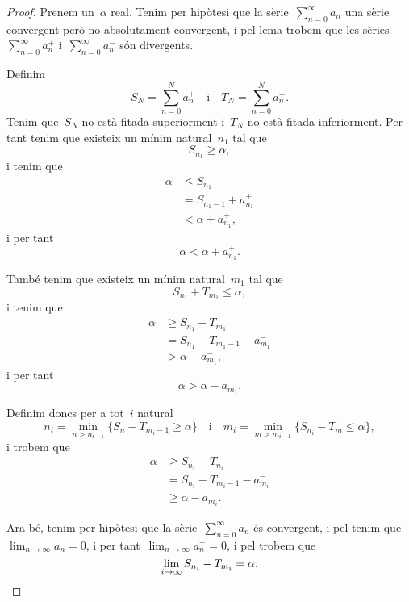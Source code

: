\documentclass[../../main.tex]{subfiles}
\begin{document}
    \begin{proof}
        Prenem un~\(\alpha\) real.
        Tenim per hipòtesi que la sèrie~\(\sum_{n=0}^{\infty}a_{n}\) una sèrie convergent però no absolutament convergent, i pel lema  trobem que les sèries~\(\sum_{n=0}^{\infty}a^{+}_{n}\) i~\(\sum_{n=0}^{\infty}a^{-}_{n}\) són divergents.

        Definim
        \[
            S_{N}=\sum_{n=0}^{N}a^{+}_{n}\quad\text{i}\quad T_{N}=\sum_{n=0}^{N}a^{-}_{n}.
        \]
        Tenim que~\(S_{N}\) no està fitada superiorment i~\(T_{N}\) no està fitada inferiorment.
        Per tant tenim que existeix un mínim natural~\(n_{1}\) tal que
        \[
            S_{n_{1}}\geq\alpha,
        \]
        i tenim que
        \begin{align*}
            \alpha&\leq S_{n_{1}} \\
            &=S_{n_{1}-1}+a^{+}_{n_{1}} \\
            &<\alpha+a^{+}_{n_{1}},
        \end{align*}
        i per tant
        \[
            \alpha<\alpha+a^{+}_{n_{1}}.
        \]

        També tenim que existeix un mínim natural~\(m_{1}\) tal que
        \[
            S_{n_{1}}+T_{m_{1}}\leq\alpha,
        \]
        i tenim que
        \begin{align*}
            \alpha&\geq S_{n_{1}}-T_{m_{1}} \\
            &=S_{n_{1}}-T_{m_{1}-1}-a^{-}_{m_{1}} \\
            &>\alpha-a^{-}_{m_{1}},
        \end{align*}
        i per tant
        \[
            \alpha>\alpha-a^{-}_{m_{1}}.
        \]

        Definim doncs per a tot~\(i\) natural
        \[
            n_{i}=\min_{n>n_{i-1}}\{S_{n}-T_{m_{i}-1}\geq\alpha\}\quad\text{i}\quad m_{i}=\min_{m>m_{i-1}}\{S_{n_{i}}-T_{m}\leq\alpha\},
        \]
        i trobem que
        \begin{align*}
            \alpha&\geq S_{n_{i}}-T_{n_{i}} \\
            &=S_{n_{i}}-T_{m_{i}-1}-a^{-}_{m_{i}} \\
            &\geq\alpha-a^{-}_{m_{i}}.
        \end{align*}

        Ara bé, tenim per hipòtesi que la sèrie~\(\sum_{n=0}^{\infty}a_{n}\) és convergent, i pel \corollari{}  tenim que~\(\lim_{n\to\infty}a_{n}=0\), i per tant~\(\lim_{n\to\infty}a^{-}_{n}=0\), i pel  trobem que
        \[
            \lim_{i\to\infty}S_{n_{i}}-T_{m_{i}}=\alpha.\qedhere
        \]
    \end{proof}
\end{document}
